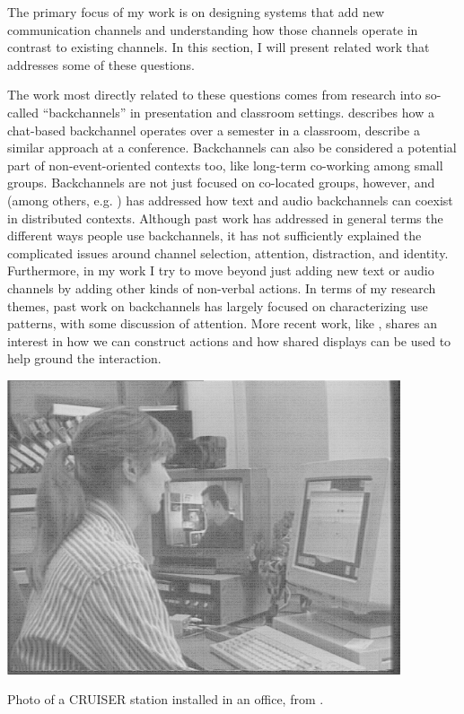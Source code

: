 The primary focus of my work is on designing systems that add new communication channels and understanding how those channels operate in contrast to existing channels. In this section, I will present related work that addresses some of these questions.


The work most directly related to these questions comes from research into so-called ``backchannels'' in presentation and classroom settings. \citet{Yardi:2006uk} describes how a chat-based backchannel operates over a semester in a classroom, \citet{mccarthy_digital_2004} describe a similar approach at a conference. Backchannels can also be considered a potential part of non-event-oriented contexts too, like long-term co-working among small groups. \citep{Huang:2003ef} Backchannels are not just focused on co-located groups, however, and \citet{kellogg_leveraging_2006} (among others, e.g.  \citep{Yankelovich:2005bx}) has addressed how text and audio backchannels can coexist in distributed contexts. Although past work has addressed in general terms the different ways people use backchannels, it has not sufficiently explained the complicated issues around channel selection, attention, distraction, and identity. Furthermore, in my work I try to move beyond just adding new text or audio channels by adding other kinds of non-verbal actions. In terms of my research themes, past work on backchannels has largely focused on characterizing use patterns, with some discussion of attention. More recent work, like \citep{Bergstrom:wl}, shares an interest in how we can construct actions and how shared displays can be used to help ground the interaction.

\begin{marginfigure}
	\includegraphics{figures/CRUISER.png}
	\caption{Photo of a CRUISER station installed in an office, from \citep{Fish:1992vz}.}
	\label{fig:cruiser}
\end{marginfigure}

